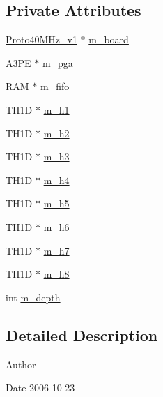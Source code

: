 \subsection*{Private Attributes}
\begin{DoxyCompactItemize}
\item 
\hyperlink{classProto40MHz__v1}{Proto40\+M\+Hz\+\_\+v1} $\ast$ \hyperlink{classStorageFifo_adca2141575d4994ef13e3dabe2e06c52}{m\+\_\+board}
\item 
\hyperlink{classA3PE}{A3\+PE} $\ast$ \hyperlink{classStorageFifo_a9e4b9d56d0cc911f124a2848d6b43981}{m\+\_\+pga}
\item 
\hyperlink{classRAM}{R\+AM} $\ast$ \hyperlink{classStorageFifo_a4b1f3eb44df4f2d46a8a62189d662390}{m\+\_\+fifo}
\item 
T\+H1D $\ast$ \hyperlink{classStorageFifo_abe762844e442bc8188643b18b276d801}{m\+\_\+h1}
\item 
T\+H1D $\ast$ \hyperlink{classStorageFifo_a3caf6211541aaa4be8e60c03d79bf253}{m\+\_\+h2}
\item 
T\+H1D $\ast$ \hyperlink{classStorageFifo_a7e6b54c96a9b53a9917f7f21bda12b2e}{m\+\_\+h3}
\item 
T\+H1D $\ast$ \hyperlink{classStorageFifo_ad026ffc1c7590bb3563538490be9aa00}{m\+\_\+h4}
\item 
T\+H1D $\ast$ \hyperlink{classStorageFifo_ae9133c5421f9fa166b837933706d2a59}{m\+\_\+h5}
\item 
T\+H1D $\ast$ \hyperlink{classStorageFifo_a39ca376b2a74643c54e4df2dfabf0906}{m\+\_\+h6}
\item 
T\+H1D $\ast$ \hyperlink{classStorageFifo_a01784ff4138a1b32eb517931b5866cc6}{m\+\_\+h7}
\item 
T\+H1D $\ast$ \hyperlink{classStorageFifo_aeef4b7183e14d05bab673d948d85b84c}{m\+\_\+h8}
\item 
int \hyperlink{classStorageFifo_a4312878a2a96e6a306be9e5fd99064d5}{m\+\_\+depth}
\end{DoxyCompactItemize}


\subsection{Detailed Description}
\begin{DoxyAuthor}{Author}

\end{DoxyAuthor}
\begin{DoxyDate}{Date}
2006-\/10-\/23 
\end{DoxyDate}



